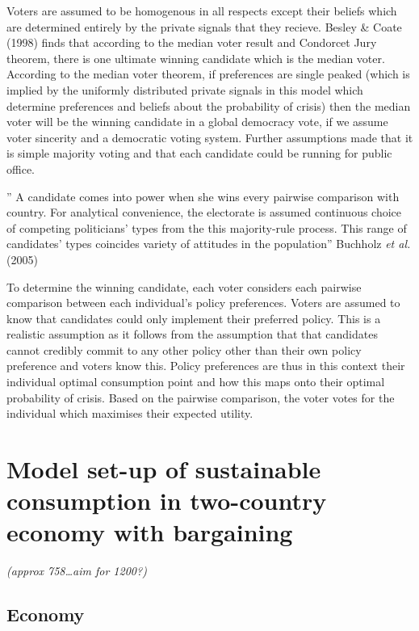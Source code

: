 \documentclass[11pt,preprint, authoryear]{elsarticle}
\numberwithin{equation}{section}
\numberwithin{figure}{section}
\numberwithin{table}{section}
\begin{document}
Voters are assumed to be homogenous in all respects except their beliefs
which are determined entirely by the private signals that they recieve.
Besley \& Coate (1998) finds that according to the median voter result
and Condorcet Jury theorem, there is one ultimate winning candidate
which is the median voter. According to the median voter theorem, if
preferences are single peaked (which is implied by the uniformly
distributed private signals in this model which determine preferences
and beliefs about the probability of crisis) then the median voter will
be the winning candidate in a global democracy vote, if we assume voter
sincerity and a democratic voting system. Further assumptions made that
it is simple majority voting and that each candidate could be running
for public office.

'' A candidate comes into power when she wins every pairwise comparison
with country. For analytical convenience, the electorate is assumed
continuous choice of competing politicians' types from the this
majority-rule process. This range of candidates' types coincides variety
of attitudes in the population'' Buchholz \emph{et al.} (2005)

To determine the winning candidate, each voter considers each pairwise
comparison between each individual's policy preferences. Voters are
assumed to know that candidates could only implement their preferred
policy. This is a realistic assumption as it follows from the assumption
that that candidates cannot credibly commit to any other policy other
than their own policy preference and voters know this. Policy
preferences are thus in this context their individual optimal
consumption point and how this maps onto their optimal probability of
crisis. Based on the pairwise comparison, the voter votes for the
individual which maximises their expected utility.

\hypertarget{model-set-up-of-sustainable-consumption-in-two-country-economy-with-bargaining}{%
\section{Model set-up of sustainable consumption in two-country economy
with
bargaining}\label{model-set-up-of-sustainable-consumption-in-two-country-economy-with-bargaining}}

\emph{(approx 758\ldots aim for 1200?)}

\hypertarget{economy-1}{%
\subsection*{Economy}\label{economy-1}}
\end{document}
